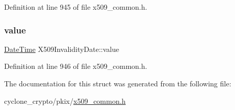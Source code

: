 Definition at line 945 of file x509\+\_\+common.\+h.

\mbox{\label{structX509InvalidityDate_a45d8ce42e99a17e69ae7cb5fca80383d}} 
\subsubsection{\texorpdfstring{value}{value}}
{\footnotesize\ttfamily \hyperlink{structDateTime}{Date\+Time} X509\+Invalidity\+Date\+::value}



Definition at line 946 of file x509\+\_\+common.\+h.



The documentation for this struct was generated from the following file\+:\begin{DoxyCompactItemize}
\item 
cyclone\+\_\+crypto/pkix/\hyperlink{pkix_2x509__common_8h}{x509\+\_\+common.\+h}\end{DoxyCompactItemize}
